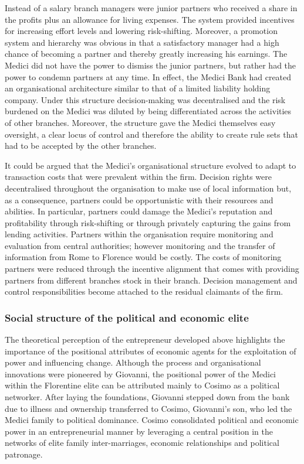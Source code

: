 Instead of a salary branch managers were junior partners who received a share in the profits plus an allowance for living expenses. The system provided incentives for increasing effort levels and lowering risk-shifting. Moreover, a promotion system and hierarchy was obvious in that a satisfactory manager had a high chance of becoming a partner and thereby greatly increasing his earnings. The Medici did not have the power to dismiss the junior partners, but rather had the power to condemn partners at any time. In effect, the Medici Bank had created an organisational architecture similar to that of a limited liability holding company. Under this structure decision-making was decentralised and the risk burdened on the Medici was diluted by being differentiated across the activities of other branches. Moreover, the structure gave the Medici themselves easy oversight, a clear locus of control and therefore the ability to create rule sets that had to be accepted by the other branches.

It could be argued that the Medici's organisational structure evolved to adapt to transaction costs that were prevalent within the firm. Decision rights were decentralised throughout the organisation to make use of local information but, as a consequence, partners could be opportunistic with their resources and abilities. In particular, partners could damage the Medici's reputation and profitability through risk-shifting or through privately capturing the gains from lending activities. Partners within the organisation require monitoring and evaluation from central authorities; however monitoring and the transfer of information from Rome to Florence would be costly. The costs of monitoring partners were reduced through the incentive alignment that comes with providing partners from different branches stock in their branch. Decision management and control responsibilities become attached to the residual claimants of the firm.

\subsubsection{Social structure of the political and economic elite}

The theoretical perception of the entrepreneur developed above highlights the importance of the positional attributes of economic agents for the exploitation of power and influencing change. Although the process and organisational innovations were pioneered by Giovanni, the positional power of the Medici within the Florentine elite can be attributed mainly to Cosimo as a political networker. After laying the foundations, Giovanni stepped down from the bank due to illness and ownership transferred to Cosimo, Giovanni's son, who led the Medici family to political dominance. Cosimo consolidated political and economic power in an entrepreneurial manner by leveraging a central position in the networks of elite family inter-marriages, economic relationships and political patronage. 

